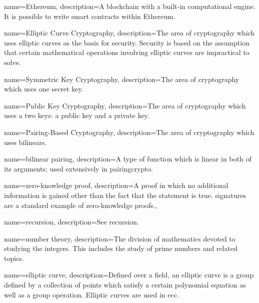 {
    name={Ethereum},
    description={A blockchain with a built-in computational engine.
        It is possible to write \glspl{smart contract} within Ethereum.}
}

{
    name={Elliptic Curve Cryptography},
    description={The area of cryptography which uses \glspl{elliptic curve}
        as the basis for security.
        Security is based on the assumption that certain
        mathematical operations involving \glspl{elliptic curve}
        are impractical to solve.}
}

{
    name={Symmetric Key Cryptography},
    description={The area of cryptography which uses one secret key.}
}

{
    name={Public Key Cryptography},
    description={The area of cryptography which uses a two keys:
        a public key and a private key.}
}

{
    name={Pairing-Based Cryptography},
    description={The area of cryptography which uses \glspl{bilinear}.}
}

{
    name={bilinear pairing},
    description={A type of \gls{function} which is linear
        in both of its arguments;
        used extensively in \gls{pairingcrypto}.}
}

{
    name={zero-knowledge proof},
    description={A proof in which no additional information
        is gained other than the fact that the statement is true.
        \Glspl{signature} are a standard example of zero-knowledge
        proofs.},
}

{
    name={recursion},
    description={See \gls{recursion}.}
}


{
    name={number theory},
    description={The division of mathematics devoted to studying
        the integers.
        This includes the study of prime numbers and related topics.}
}

{
    name={elliptic curve},
    description={Defined over a \gls{field}, an elliptic curve is a \gls{group}
        defined by a collection of points which satisfy a certain polynomial
        equation as well as a group operation.
        Elliptic curves are used in \gls{ecc}.}
}

